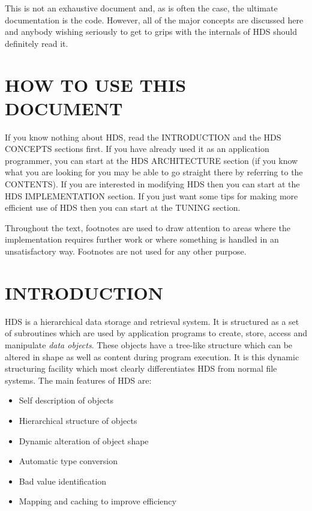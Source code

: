 This is not an exhaustive document and, as is often the case, the ultimate
documentation is the code. However, all of the major concepts are discussed
here and anybody wishing seriously to get to grips with the internals of
HDS should definitely read it.

\section {HOW TO USE THIS DOCUMENT}

If you know nothing about HDS, read the INTRODUCTION and the HDS CONCEPTS
sections first. If you have already used it as an application programmer, you
can start at the HDS ARCHITECTURE section (if you know what you are looking for
you may be able to go straight there by referring to the CONTENTS). If you are
interested in modifying HDS then you can start at the HDS IMPLEMENTATION
section. If you just want some tips for making more efficient use of HDS then
you can start at the TUNING section.

Throughout the text, footnotes are used to draw attention to areas where
the implementation requires further work or where something is handled in
an unsatisfactory way. Footnotes are not used for any other purpose.

\section {INTRODUCTION}

HDS is a hierarchical data storage and retrieval system. It is structured as a
set of subroutines which are used by application programs to create, store,
access and manipulate {\em data objects}. These objects have a tree-like
structure which can be altered in shape as well as content during program
execution. It is this dynamic structuring facility which most clearly
differentiates HDS from normal file systems. The main features of HDS are:

\begin {itemize}
\item Self description of objects
\item Hierarchical structure of objects
\item Dynamic alteration of object shape
\item Automatic type conversion
\item Bad value identification
\item Mapping and caching to improve efficiency
\end {itemize}

